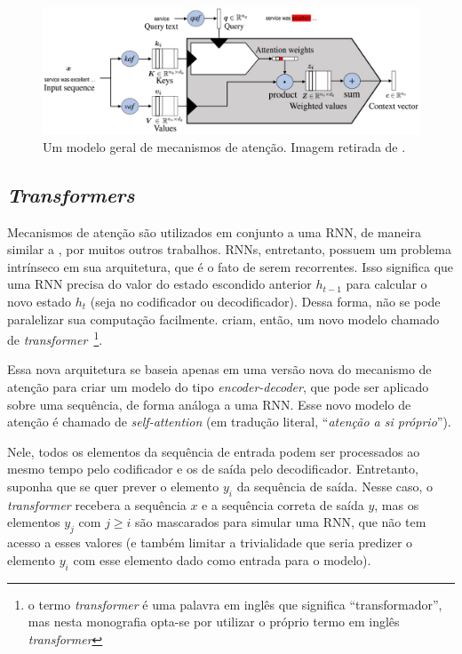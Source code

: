 \begin{figure}[h]
\centering
\includegraphics[scale=0.5]{Res/attention-img1.jpg}
\caption{Um modelo geral de mecanismos de atenção. Imagem retirada de
\cite{galassi:2021:attention-in-nlp}.}
\label{attention-img1.jpg}
\end{figure}

\subsection{\textit{Transformers}}%
\label{sub:transformers}

Mecanismos de atenção são utilizados em conjunto a uma RNN, de maneira similar a
\cite{bahdanau-etal:2014:attention-mechanism}, por muitos outros trabalhos.
RNNs, entretanto, possuem um problema intrínseco em sua arquitetura, que é o
fato de serem recorrentes. Isso significa que uma RNN precisa do valor do estado
escondido anterior $h_{t-1}$ para calcular o novo estado $h_t$ (seja no
codificador ou decodificador). Dessa forma, não se pode paralelizar sua
computação facilmente. \cite{vaswani-etal:2017:attention-is-all-you-need} criam,
então, um novo modelo chamado de \textit{transformer}~\footnote{o termo
\textit{transformer} é uma palavra em inglês que significa ``transformador'',
mas nesta monografia opta-se por utilizar o próprio termo em inglês
\textit{transformer}}.

Essa nova arquitetura se baseia apenas em uma versão nova do mecanismo de
atenção para criar um modelo do tipo \textit{encoder-decoder}, que pode ser
aplicado sobre uma sequência, de forma análoga a uma RNN. Esse novo modelo de
atenção é chamado de \textit{self-attention} (em tradução literal,
``\textit{atenção a si próprio}'').

Nele, todos os elementos da sequência de entrada podem ser processados ao mesmo
tempo pelo codificador e os de saída pelo decodificador.  Entretanto, suponha
que se quer prever o elemento $y_i$ da sequência de saída.  Nesse caso, o
\textit{transformer} recebera a sequência $x$ e a sequência correta de saída
$y$, mas os elementos $y_j$ com $j\geq i$ são mascarados para simular uma RNN,
que não tem acesso a esses valores (e também limitar a trivialidade que seria
predizer o elemento $y_i$ com esse elemento dado como entrada para o modelo).

